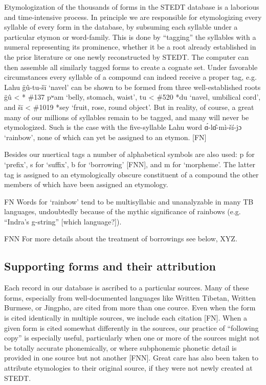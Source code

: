 Etymologization of the thousands of forms in the STEDT database is a laborious and time-intensive process. In principle we are responsible for etymologizing every syllable of every form in the database, by subsuming each syllable under a particular etymon or word-family. This is done by “tagging” the syllables with a numeral representing its prominence, whether it be a root already established in the prior literature or one newly reconstructed by STEDT. The computer can then assemble all similarly tagged forms to create a cognate set. Under favorable circumstances every syllable of a compound can indeed receive a proper tag, e.g. Lahu g̈û-tu-šī ‘navel’ can be shown to be formed from three well-established roots g̈û < * \#137 pʷam ‘belly, stomach, waist’, tu < \#520 *du ‘navel, umbilical cord’, and šī < \#1019 *sey ‘fruit, rose, round object’. But in reality, of course, a great many of our millions of syllables remain to be tagged, and many will never be etymologized. Such is the case with the five-syllable Lahu word ɑ́-lɑ̂-mì-ší-jɔ ‘rainbow’, none of which can yet be assigned to an etymon. [FN]

Besides our nuertical tags a number of alphabetical symbols are also used: p for ‘prefix’, s for ‘suffix’, b for ‘borrowing’ [FNN], and m for ‘morpheme’. The latter tag is assigned to an etymologically obscure constituent of a compound the other members of which have been assigned an etymology.

FN Words for ‘rainbow’ tend to be multisyllabic and unanalyzable in many TB languages, undoubtedly because of the mythic significance of rainbows (e.g. “Indra’s g-string” [which language?]).

FNN For more details about the treatment of borrowings see below, XYZ.

\subsection{Supporting forms and their attribution}

Each record in our database is ascribed to a particular sources. Many of these forms, especially from well-documented languages like Written Tibetan, Written Burmese, or Jingpho, are cited from more than one cource. Even when the form is cited identically in multiple sources, we include each citation [FN]. When a given form is cited somewhat differently in the sources, our practice of “following copy” is especially useful, particularly when one or more of the sources might not be totally accurate phonemically, or where subphonemic phonetic detail is provided in one source but not another [FNN]. Great care has also been taken to attribute etymologies to their original source, if they were not newly created at STEDT. 

